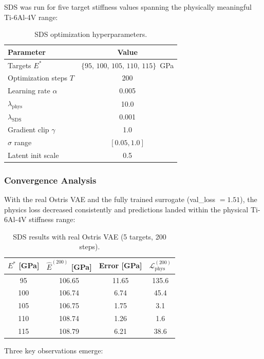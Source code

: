 \documentclass[12pt,a4paper]{article}
\newcommand{\loss}{\mathcal{L}}
\newcommand{\Etar}{E^{*}}
\theoremstyle{definition}
\begin{document}
SDS was run for five target stiffness values spanning the physically
meaningful Ti-6Al-4V range:
\begin{table}[h]
  \centering
  \caption{SDS optimization hyperparameters.}
  \label{tab:sds_config}
  \begin{tabular}{lc}
    \toprule
    Parameter & Value \\
    \midrule
    Targets $\Etar$ & $\{95,\, 100,\, 105,\, 110,\, 115\}$~GPa \\
    Optimization steps $T$ & 200 \\
    Learning rate $\alpha$ & 0.005 \\
    $\lambda_{\mathrm{phys}}$ & 10.0 \\
    $\lambda_{\mathrm{SDS}}$ & 0.001 \\
    Gradient clip $\gamma$ & 1.0 \\
    $\sigma$ range & $[0.05, 1.0]$ \\
    Latent init scale & 0.5 \\
    \bottomrule
  \end{tabular}
\end{table}

\subsubsection{Convergence Analysis}

With the real Ostris VAE and the fully trained surrogate (val\_loss $= 1.51$),
the physics loss decreased consistently and predictions landed
within the physical Ti-6Al-4V stiffness range:
\begin{table}[h]
  \centering
  \caption{SDS results with real Ostris VAE (5 targets, 200 steps).}
  \label{tab:sds_results}
  \begin{tabular}{cccc}
    \toprule
    $\Etar$ [GPa] & $\hat{E}^{(200)}$ [GPa] & Error [GPa] & $\loss_{\mathrm{phys}}^{(200)}$ \\
    \midrule
    95  & 106.65 & 11.65 & 135.6 \\
    100 & 106.74 & 6.74  & 45.4  \\
    105 & 106.75 & 1.75  & 3.1   \\
    110 & 108.74 & 1.26  & 1.6   \\
    115 & 108.79 & 6.21  & 38.6  \\
    \bottomrule
  \end{tabular}
\end{table}

Three key observations emerge:
\end{document}
